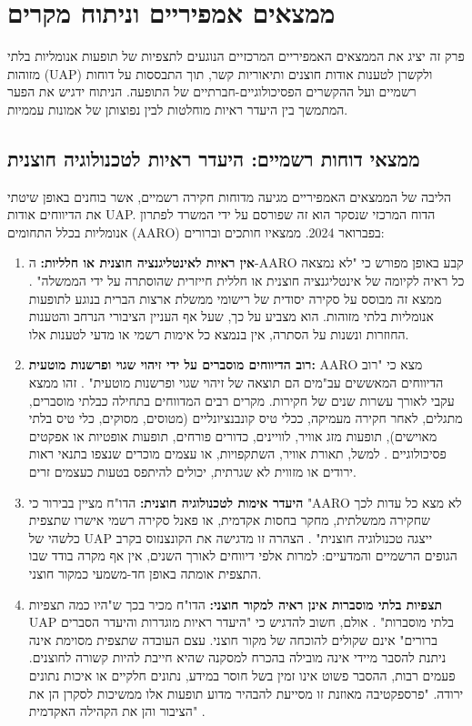 \documentclass[12pt,a4paper]{article}
\begin{document}
\section{ממצאים אמפיריים וניתוח מקרים}
פרק זה יציג את הממצאים האמפיריים המרכזיים הנוגעים לתצפיות של תופעות אנומליות בלתי מזוהות (UAP) ולקשרן לטענות אודות חוצנים ותיאוריות קשר, תוך התבססות על דוחות רשמיים ועל ההקשרים הפסיכולוגיים-חברתיים של התופעה. הניתוח ידגיש את הפער המתמשך בין היעדר ראיות מוחלטות לבין נפוצותן של אמונות עממיות.

\subsection{ממצאי דוחות רשמיים: היעדר ראיות לטכנולוגיה חוצנית}
הליבה של הממצאים האמפיריים מגיעה מדוחות חקירה רשמיים, אשר בוחנים באופן שיטתי את הדיווחים אודות UAP. הדוח המרכזי שנסקר הוא זה שפורסם על ידי המשרד לפתרון אנומליות בכלל התחומים (AARO) בפברואר 2024. ממצאיו חותכים וברורים:

\begin{enumerate}
    \item \textbf{אין ראיות לאינטליגנציה חוצנית או חלליות:} ה-AARO קבע באופן מפורש כי "לא נמצאה כל ראיה לקיומה של אינטליגנציה חוצנית או חללית חייזרית שהוסתרה על ידי הממשלה" \cite[p. 2]{s41599-025-04799-8}. ממצא זה מבוסס על סקירה יסודית של רישומי ממשלת ארצות הברית בנוגע לתופעות אנומליות בלתי מזוהות. הוא מצביע על כך, שעל אף העניין הציבורי הנרחב והטענות החוזרות ונשנות על הסתרה, אין בנמצא כל אימות רשמי או מדעי לטענות אלו.
    \item \textbf{רוב הדיווחים מוסברים על ידי זיהוי שגוי ופרשנות מוטעית:} AARO מצא כי "רוב הדיווחים המאששים עב"מים הם תוצאה של זיהוי שגוי ופרשנות מוטעית" \cite[p. 1]{s41599-025-04799-8}. זהו ממצא עקבי לאורך עשרות שנים של חקירות. מקרים רבים המדווחים בתחילה כבלתי מוסברים, מתגלים, לאחר חקירה מעמיקה, ככלי טיס קונבנציונליים (מטוסים, מסוקים, כלי טיס בלתי מאוישים), תופעות מזג אוויר, לוויינים, כדורים פורחים, תופעות אופטיות או אפקטים פסיכולוגיים \cite[p. 1]{s41599-025-04799-8}. למשל, תאורת אוויר, השתקפויות, או עצמים מוכרים שנצפו בתנאי ראות ירודים או מזווית לא שגרתית, יכולים להיתפס בטעות כעצמים זרים.
    \item \textbf{היעדר אימות לטכנולוגיה חוצנית:} הדו"ח מציין בבירור כי "AARO לא מצא כל עדות לכך שחקירה ממשלתית, מחקר בחסות אקדמית, או פאנל סקירה רשמי אישרו שתצפית כלשהי של UAP ייצגה טכנולוגיה חוצנית" \cite[p. 1]{s41599-025-04799-8}. הצהרה זו מדגישה את הקונצנזוס בקרב הגופים הרשמיים והמדעיים: למרות אלפי דיווחים לאורך השנים, אין אף מקרה בודד שבו התצפית אומתה באופן חד-משמעי כמקור חוצני.
    \item \textbf{תצפיות בלתי מוסברות אינן ראיה למקור חוצני:} הדו"ח מכיר בכך ש"היו כמה תצפיות UAP בלתי מוסברות" \cite[p. 1]{s41599-025-04799-8}. אולם, חשוב להדגיש כי "היעדר ראיות מוגדרות והיעדר הסברים ברורים" \cite[p. 1]{s41599-025-04799-8} אינם שקולים להוכחה של מקור חוצני. עצם העובדה שתצפית מסוימת אינה ניתנת להסבר מיידי אינה מובילה בהכרח למסקנה שהיא חייבת להיות קשורה לחוצנים. פעמים רבות, ההסבר פשוט אינו זמין בשל חוסר במידע, נתונים חלקיים או איכות נתונים ירודה. "פרספקטיבה מאוזנת זו מסייעת להבהיר מדוע תופעות אלו ממשיכות לסקרן הן את הציבור והן את הקהילה האקדמית" \cite[p. 1]{s41599-025-04799-8}.
\end{enumerate}
\end{document}
